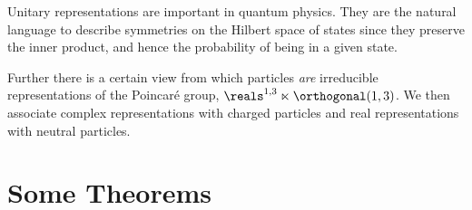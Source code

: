 \begin{app}{}{}
    Unitary representations are important in quantum physics.
    They are the natural language to describe symmetries on the Hilbert
    space of states since they preserve the inner product, and hence the probability
    of being in a given state.
    
    Further there is a certain view from which particles \emph{are}
    irreducible representations of the Poincar\'e group, \(\reals^{1, 3} \ltimes
    \orthogonal(1, 3)\).
    We then associate complex representations with charged particles and
    real representations with neutral particles.
\end{app}

\section{Some Theorems}
